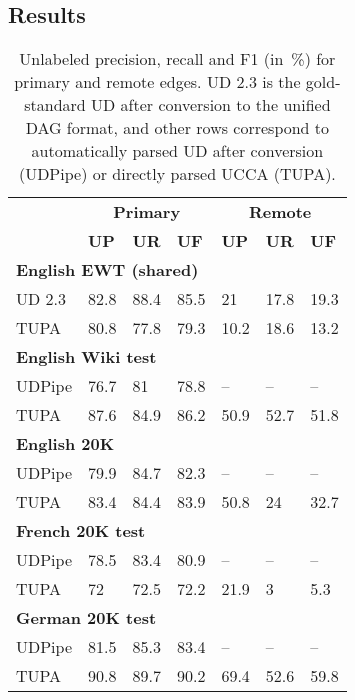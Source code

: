 \documentclass[11pt,a4paper]{article}
\begin{document}
\subsection{Results}\label{sec:results}

\begin{table}[t]
\centering
\begin{tabular}{l|lll|lll}
& \multicolumn{3}{c|}{\footnotesize \bf Primary} & \multicolumn{3}{c}{\footnotesize \bf Remote} \\
& \footnotesize \textbf{UP} & \footnotesize \textbf{UR} & \footnotesize \textbf{UF}
& \footnotesize \textbf{UP} & \footnotesize \textbf{UR} & \footnotesize \textbf{UF} \\
\hline
\multicolumn{4}{l|}{\small \bf English EWT (shared)} & \\
\footnotesize UD 2.3
& 82.8 & 88.4 & 85.5 & 21 & 17.8 & 19.3 \\
\footnotesize TUPA
& 80.8 & 77.8 & 79.3 & 10.2 & 18.6 & 13.2 \\
\multicolumn{4}{l|}{\small \bf English Wiki test} & \\
\footnotesize UDPipe
& 76.7 & 81 & 78.8 & -- & -- & -- \\
\footnotesize TUPA
& 87.6 & 84.9 & 86.2 & 50.9 & 52.7 & 51.8 \\
\multicolumn{4}{l|}{\small \bf English 20K} & \\
\footnotesize UDPipe
& 79.9 & 84.7 & 82.3 & -- & -- & -- \\
\footnotesize TUPA
& 83.4 & 84.4 & 83.9 & 50.8 & 24 & 32.7 \\
\multicolumn{4}{l|}{\small \bf French 20K test} & \\
\footnotesize UDPipe
& 78.5 & 83.4 & 80.9 & -- & -- & -- \\
\footnotesize TUPA
& 72 & 72.5 & 72.2 & 21.9 & 3 & 5.3 \\
\multicolumn{4}{l|}{\small \bf German 20K test} & \\
\footnotesize UDPipe
& 81.5 & 85.3 & 83.4 & -- & -- & -- \\
\footnotesize TUPA
& 90.8 & 89.7 & 90.2 & 69.4 & 52.6 & 59.8
\end{tabular}
\caption{
Unlabeled precision, recall and F1 (in~\%) for primary and remote edges.
UD 2.3 is the gold-standard UD after conversion to the unified DAG format,
and other rows correspond to automatically parsed UD after conversion (UDPipe)
or directly parsed UCCA (TUPA).
\label{tab:conversion_results_unlabeled}}
\end{table}
\end{document}
